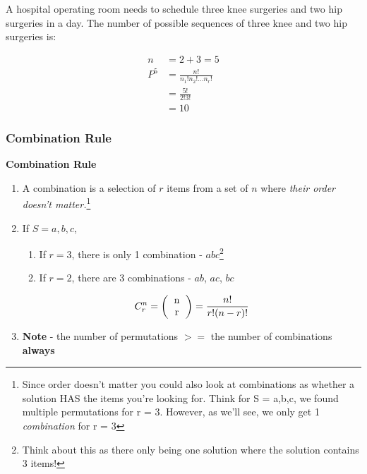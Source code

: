 \documentclass[../INDE315.tex]{subfiles}
\begin{document}
\begin{exmp}
    A hospital operating room needs to schedule three knee surgeries and
    two hip surgeries in a day. The number of possible sequences of three knee and two hip surgeries is:
\end{exmp}
\begin{equation*}
    \begin{aligned}
        n &= 2 + 3 = 5 \\
        P^5 &= \frac{n!}{n_1! n_2! \dots n_r!} \\
            &= \frac{5!}{2!3!} \\
            &= 10
    \end{aligned}
\end{equation*}

\subsubsection*{Combination Rule}
\begin{defn}
    \textbf{Combination Rule}
    \begin{enumerate}
        \item A combination is a selection of $r$ items from a set of $n$ where \emph{their order doesn't matter.}\footnote{Since order doesn't matter you could also look at combinations as whether a solution HAS the items you're looking for. Think for S = {a,b,c}, we found multiple permutations for r = 3. However, as we'll see, we only get 1 \emph{combination} for r = 3}
        \item If $S = {a,b,c}$,
            \begin{enumerate}
                \item If $r = 3$, there is only 1 combination - $abc$\footnote{Think about this as there only being one solution where the solution contains 3 items!}
                \item If $r = 2$, there are 3 combinations - $ab$, $ac$, $bc$
            \end{enumerate}
            \begin{equation*}
                \begin{aligned}
                    C^n_r = \left( \begin{tabular}{c}
                        n \\
                        r
                        \end{tabular}  \right) = \frac{n!}{r!(n-r)!} 
                \end{aligned}
            \end{equation*}
        \item \textbf{Note} - the number of permutations $>=$ the number of combinations \textbf{always}
    \end{enumerate}
\end{defn}
\end{document}
